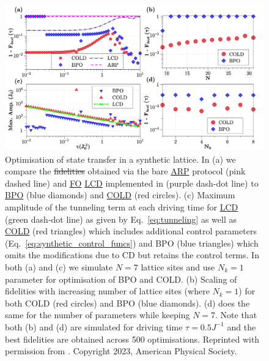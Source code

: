 \documentclass[a4paper,oneside,11pt]{book}
\newcommand{\acrref}[1]{\hyperref[acr:#1]{#1}}
\providecommand{\DIFaddtex}[1]{{\protect\color{blue}\uwave{#1}}} %
\providecommand{\DIFdeltex}[1]{{\protect\color{red}\sout{#1}}}                      %
\providecommand{\DIFaddFL}[1]{\DIFadd{#1}} %
\providecommand{\DIFdelFL}[1]{\DIFdel{#1}} %
\providecommand{\DIFaddbeginFL}{} %
\providecommand{\DIFaddendFL}{} %
\providecommand{\DIFdelbeginFL}{} %
\providecommand{\DIFdelendFL}{} %
\providecommand{\DIFadd}[1]{\texorpdfstring{\DIFaddtex{#1}}{#1}} %
\providecommand{\DIFdel}[1]{\texorpdfstring{\DIFdeltex{#1}}{}} %
\newcommand{\DIFscaledelfig}{0.5}
\newlength{\DIFdelgraphicswidth} %
\newlength{\DIFdelgraphicsheight} %
\newcommand{\DIFaddincludegraphics}[2][]{{\color{blue}\fbox{\DIFOincludegraphics[#1]{#2}}}} %
\newcommand{\DIFdelincludegraphics}[2][]{%
\sbox{\DIFdelgraphicsbox}{\DIFOincludegraphics[#1]{#2}}%
\settoboxwidth{\DIFdelgraphicswidth}{\DIFdelgraphicsbox} %
\settoboxtotalheight{\DIFdelgraphicsheight}{\DIFdelgraphicsbox} %
\scalebox{\DIFscaledelfig}{%
\parbox[b]{\DIFdelgraphicswidth}{\usebox{\DIFdelgraphicsbox}\\[-\baselineskip] \rule{\DIFdelgraphicswidth}{0em}}\llap{\resizebox{\DIFdelgraphicswidth}{\DIFdelgraphicsheight}{%
\setlength{\unitlength}{\DIFdelgraphicswidth}%
\begin{picture}(1,1)%
\thicklines\linethickness{2pt} %
{\color[rgb]{1,0,0}\put(0,0){\framebox(1,1){}}}%
{\color[rgb]{1,0,0}\put(0,0){\line( 1,1){1}}}%
{\color[rgb]{1,0,0}\put(0,1){\line(1,-1){1}}}%
\end{picture}%
}\hspace*{3pt}}} %
} %
\DeclareRobustCommand{\DIFaddbeginFL}{\DIFOaddbeginFL \let\includegraphics\DIFaddincludegraphics} %
\DeclareRobustCommand{\DIFaddendFL}{\DIFOaddendFL \let\includegraphics\DIFOincludegraphics} %
\DeclareRobustCommand{\DIFdelbeginFL}{\DIFOdelbeginFL \let\includegraphics\DIFdelincludegraphics} %
\DeclareRobustCommand{\DIFdelendFL}{\DIFOaddendFL \let\includegraphics\DIFOincludegraphics} %
\begin{document}
\begin{figure}[t]
    \centering
    \includegraphics[width=\linewidth]{images/synthetic_lattice.png} \caption[COLD plots for ARP transport in a synthetic lattice]{Optimisation of state transfer in a synthetic lattice.  In (a) we compare the \DIFdelbeginFL \DIFdelFL{fidelities }\DIFdelendFL \DIFaddbeginFL \DIFaddFL{infidelities }\DIFaddendFL obtained via the bare \acrref{ARP} protocol (pink dashed line) and \acrref{FO} \acrref{LCD} implemented in \cite{meier_counterdiabatic_2020} (purple dash-dot line) to \acrref{BPO} (blue diamonds) and \acrref{COLD} (red circles). (c) Maximum amplitude of the tunneling term at each driving time for \acrref{LCD} (green dash-dot line) as given by Eq.~\eqref{eq:tunneling} as well as \acrref{COLD} (red triangles) which includes additional control parameters (Eq.~\eqref{eq:synthetic_control_funcs}) and BPO (blue triangles) which omits the modifications due to CD but retains the control terms. In both (a) and (c) we simulate $N = 7$ lattice sites and use $N_k = 1$ parameter for optimisation of BPO and COLD.  (b) Scaling of fidelities with increasing number of lattice sites (where $N_k = 1$) for both COLD (red circles) and BPO (blue diamonds). (d) does the same for the number of parameters while keeping $N=7$.  Note that both (b) and (d) are simulated for driving time $\tau = 0.5 J^{-1}$ and the best fidelities are obtained across 500 optimisations. Reprinted with permission from \cite{cepaite_counterdiabatic_2023}. Copyright 2023, American Physical Society.}\label{fig:Synthetic}
\end{figure}
\end{document}
